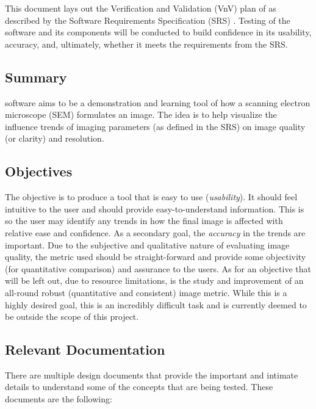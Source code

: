 \documentclass[12pt, titlepage]{article}
\begin{document}
This document lays out the Verification and Validation (VnV) plan of \progname{}
as described by the Software Requirements Specification (SRS) 
\citep{SRS}. Testing of the software and its components will be conducted to build confidence in 
its usability, accuracy, and, ultimately, whether it meets the requirements from the SRS.

\subsection{Summary}

\progname{} software aims to be a demonstration and learning tool of how a scanning electron 
microscope (SEM) formulates an image. The idea is to help visualize the influence trends of imaging 
parameters (as defined in the SRS) on image quality (or clarity) and resolution.


\subsection{Objectives} \label{sec_objectives}

The objective is to produce a tool that is easy to use (\textit{usability}). It should feel intuitive 
to the user and should provide easy-to-understand information. This is so the user may 
identify any trends in how the final image is affected with relative ease and confidence. As a 
secondary goal, the \textit{accuracy} in the trends are important. Due to the subjective and 
qualitative nature of evaluating image quality, the metric used should be straight-forward and 
provide some objectivity (for quantitative comparison) and assurance to the users.
As for an objective that will be left out, due to resource limitations, is the study and
improvement of an all-round robust (quantitative and consistent) image metric. While this
is a highly desired goal, this is an incredibly difficult task and is 
currently deemed to be outside the scope of this project.

\subsection{Relevant Documentation}

There are multiple design documents that provide the important and intimate details to understand 
some of the concepts that are being tested. These documents are the following:
\end{document}
